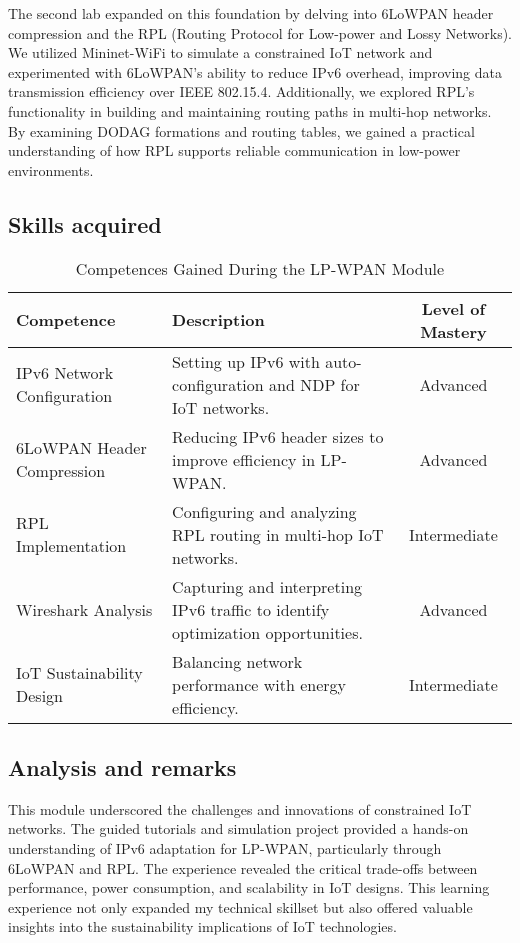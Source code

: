 \vspace{0.25cm}
The second lab expanded on this foundation by delving into 6LoWPAN header compression and the RPL (Routing Protocol for Low-power and Lossy Networks).
We utilized Mininet-WiFi to simulate a constrained IoT network and experimented with 6LoWPAN's ability to reduce IPv6 overhead, improving data transmission efficiency over IEEE 802.15.4.
Additionally, we explored RPL's functionality in building and maintaining routing paths in multi-hop networks.
By examining DODAG formations and routing tables, we gained a practical understanding of how RPL supports reliable communication in low-power environments.


\subsection{Skills acquired}

\begin{table}[H]
    \centering
    \renewcommand{\arraystretch}{1.5} %
    \begin{tabular}{|p{3.5cm}|p{8cm}|c|}
    \hline
    \rowcolor[gray]{0.8}
    \textbf{Competence} & \textbf{Description} & \textbf{Level of Mastery} \\
    \hline
    IPv6 Network Configuration & Setting up IPv6 with auto-configuration and NDP for IoT networks. & Advanced \\
    \hline
    6LoWPAN Header Compression & Reducing IPv6 header sizes to improve efficiency in LP-WPAN. & Advanced \\
    \hline
    RPL Implementation & Configuring and analyzing RPL routing in multi-hop IoT networks. & Intermediate \\
    \hline
    Wireshark Analysis & Capturing and interpreting IPv6 traffic to identify optimization opportunities. & Advanced \\
    \hline
    IoT Sustainability Design & Balancing network performance with energy efficiency. & Intermediate \\
    \hline
    \end{tabular}
    \caption{Competences Gained During the LP-WPAN Module}
\end{table}

\subsection{Analysis and remarks}
\indent \indent This module underscored the challenges and innovations of constrained IoT networks.
The guided tutorials and simulation project provided a hands-on understanding of IPv6 adaptation for LP-WPAN, particularly through 6LoWPAN and RPL.
The experience revealed the critical trade-offs between performance, power consumption, and scalability in IoT designs.
This learning experience not only expanded my technical skillset but also offered valuable insights into the sustainability implications of IoT technologies.